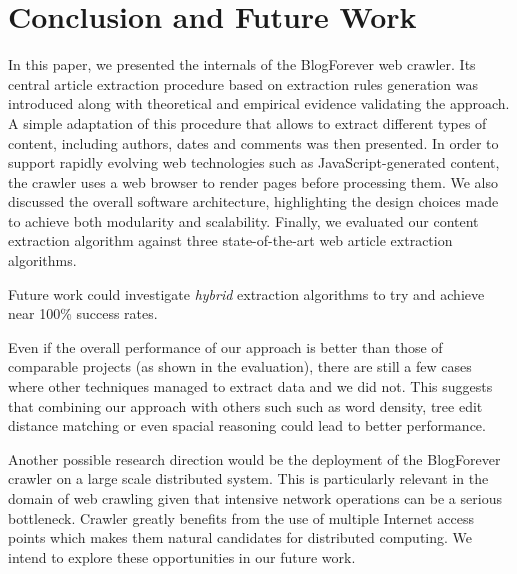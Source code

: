 \section{Conclusion and Future Work}

In this paper, we presented the internals of the BlogForever web crawler. Its central article extraction procedure based on extraction rules generation was introduced along with theoretical and empirical evidence validating the approach. A simple adaptation of this procedure that allows to extract different types of content, including authors, dates and comments was then presented. In order to support rapidly evolving web technologies such as JavaScript-generated content, the crawler uses a web browser to render pages before processing them. We also discussed the overall software architecture, highlighting the design choices made to achieve both modularity and scalability. Finally, we evaluated our content extraction algorithm against three state-of-the-art web article extraction algorithms.

Future work could investigate \emph{hybrid} extraction algorithms to try and achieve near 100\% success rates. 


Even if the overall performance of our approach is better than those of comparable projects (as shown in the evaluation), there are still a few cases where other techniques managed to extract data and we did not. This suggests that combining our approach with others such such as word density, tree edit distance matching or even spacial reasoning could lead to better performance.

Another possible research direction would be the deployment of the BlogForever crawler on a large scale distributed system. This is particularly relevant in the domain of web crawling given that intensive network operations can be a serious bottleneck. Crawler greatly benefits from the use of multiple Internet access points which makes them natural candidates for distributed computing. We intend to explore these opportunities in our future work.
